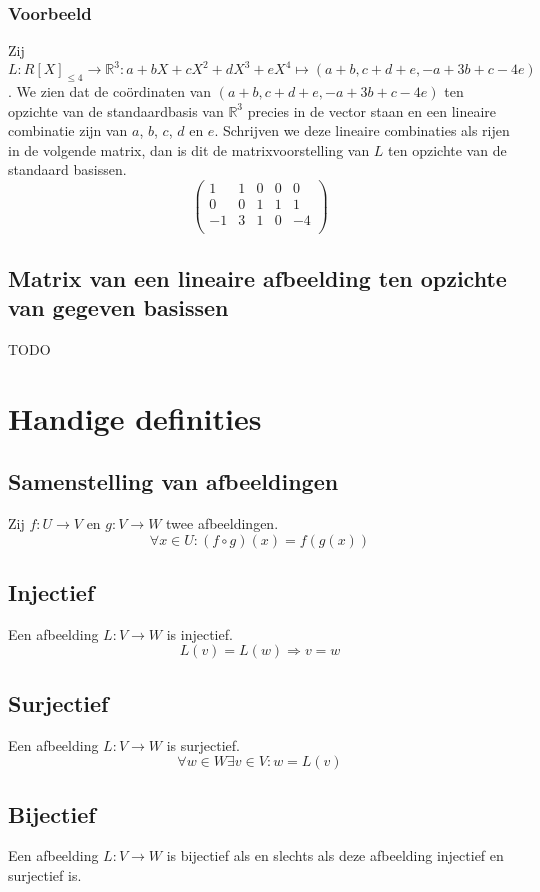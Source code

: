 \documentclass[lineaire_algebra_oplossingen.tex]{subfiles}
\begin{document}
\subsection*{Voorbeeld}
Zij $L:R[X]_{\le 4}\rightarrow \mathbb{R}^3: a+bX+cX^2+dX^3+eX^4\mapsto (a+b,c+d+e,-a+3b+c-4e)$.
We zien dat de co\"ordinaten van $(a+b,c+d+e,-a+3b+c-4e)$ ten opzichte van de standaardbasis van $\mathbb{R}^3$ precies in de vector staan en een lineaire combinatie zijn van $a$, $b$, $c$, $d$ en $e$.
Schrijven we deze lineaire combinaties als rijen in de volgende matrix, dan is dit de matrixvoorstelling van $L$ ten opzichte van de standaard basissen.
\[
\begin{pmatrix}
1 & 1 & 0 & 0 & 0\\
0 & 0 & 1 & 1 & 1\\
-1 & 3 & 1 & 0 & -4\\
\end{pmatrix}
\]

\section{Matrix van een lineaire afbeelding ten opzichte van gegeven basissen}
\label{matrix_van_lineaire_afbeeldingen_tov_gegeven_basissen}
TODO

\chapter{Handige definities}
\section{Samenstelling van afbeeldingen}
\label{samenstelling_van_afbeeldingen}
Zij $f: U \rightarrow V$ en $g: V\rightarrow W$ twee afbeeldingen.
\[
\forall x\in U: (f \circ g)(x) = f(g(x))
\]

\section{Injectief}
\label{injectief}
Een afbeelding $L: V \rightarrow W$ is injectief.
\[
L(v) = L(w) \Rightarrow v = w
\]

\section{Surjectief}
\label{surjectief}
Een afbeelding $L: V \rightarrow W$ is surjectief.
\[
\forall w \in W \exists v \in V: w=L(v)
\]

\section{Bijectief}
\label{bijectief}
Een afbeelding $L: V \rightarrow W$ is bijectief als en slechts als deze afbeelding injectief en surjectief is.
\end{document}
